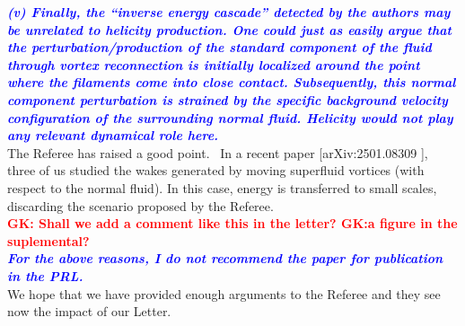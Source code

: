 \documentclass[a4paper,10pt]{article}
\def\red#1{\textcolor{red}{#1}}
\def\blue#1{\textcolor{blue}{#1}}
\def\refcomment#1{\textbf{\blue{\emph{#1}}}\\}
\begin{document}
\refcomment{(v) Finally, the “inverse energy cascade” detected by the authors may be unrelated to helicity production. One could just as easily argue that the perturbation/production of the standard component of the fluid through vortex reconnection is initially localized around the point where the filaments come into close contact. Subsequently, this normal component perturbation is strained by the specific background velocity configuration of the surrounding normal fluid. Helicity would not play any relevant dynamical role here.}

The Referee has raised a good point.  In a recent paper [arXiv:2501.08309 ], three of us studied the wakes generated by moving superfluid vortices (with respect to the normal fluid). In this case, energy is transferred to small scales, discarding the scenario proposed by the Referee.\\

\red{\textbf{GK: Shall we add a comment like this in the letter? GK:a figure in the suplemental? }}\\

\refcomment{For the above reasons, I do not recommend the paper for publication in the PRL.}

\noindent We hope that we have provided enough arguments to the Referee and they see now the impact of our Letter.
\end{document}
